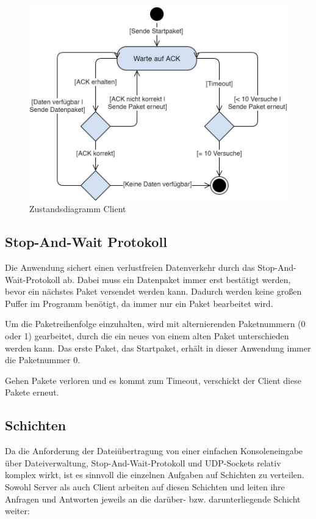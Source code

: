 \documentclass{article}
\begin{document}
		\begin{figure}[!htb]
			\centering
			\includegraphics[scale=0.3]{zustandsdiagramm_client.png}
			\caption{Zustandsdiagramm Client}
		\end{figure}

		\subsection{Stop-And-Wait Protokoll}

		Die Anwendung sichert einen verlustfreien Datenverkehr durch das Stop-And-Wait-Protokoll ab. Dabei muss ein Datenpaket immer erst bestätigt werden, bevor ein nächstes Paket versendet werden kann. Dadurch werden keine großen Puffer im Programm benötigt, da immer nur ein Paket bearbeitet wird. 

		Um die Paketreihenfolge einzuhalten, wird mit alternierenden Paketnummern (0 oder 1) gearbeitet, durch die ein neues von einem alten Paket unterschieden werden kann. Das erste Paket, das Startpaket, erhält in dieser Anwendung immer die Paketnummer 0.

		Gehen Pakete verloren und es kommt zum Timeout, verschickt der Client diese Pakete erneut.

		\subsection{Schichten}

		Da die Anforderung der Dateiübertragung von einer einfachen Konsoleneingabe über Dateiverwaltung, Stop-And-Wait-Protokoll und UDP-Sockets relativ komplex wirkt, ist es sinnvoll die einzelnen Aufgaben auf Schichten zu verteilen. Sowohl Server als auch Client arbeiten auf diesen Schichten und leiten ihre Anfragen und Antworten jeweils an die darüber- bzw. darunterliegende Schicht weiter:
\end{document}
